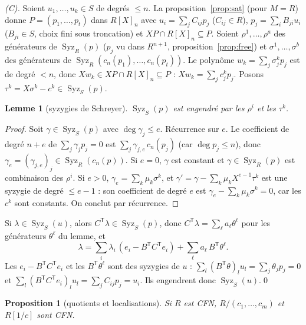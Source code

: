 \documentclass[11pt]{amsart}
\newtheorem{proposition}[theorem]{Proposition}
\newtheorem{lemma}[theorem]{Lemme}
\theoremstyle{definition}
\theoremstyle{remark}
\DeclareMathOperator{\Syz}{Syz}
\begin{document}
\emph{(C).} Soient $u_1,\dots,u_k\in S$ de degrés $\le n$. La
proposition~\ref{prop:sat} (pour $M=R$) donne $P=(p_1,\dots,p_t)$ dans
$R[X]_n$ avec $u_i=\sum_jC_{ij}p_j$ ($C_{ij}\in R$), $p_j=\sum_iB_{ji}u_i$
($B_{ji}\in S$, choix fini sous troncation) et $XP\cap R[X]_n\subseteq P$.
Soient $\rho^1,\dots,\rho^a$ des générateurs de $\Syz_R(p)$ ($p_j$ vu
dans $R^{n+1}$, proposition~\ref{prop:free}) et $\sigma^1,\dots,\sigma^b$
des générateurs de $\Syz_R(c_n(p_1),\dots,c_n(p_t))$. Le polynôme
$w_k=\sum_j\sigma^k_jp_j$ est de degré $<n$, donc
$Xw_k\in XP\cap R[X]_n\subseteq P$ : $Xw_k=\sum_jc^k_jp_j$. Posons
$\tau^k=X\sigma^k-c^k\in\Syz_S(p)$.

\begin{lemma}[syzygies de Schreyer]\label{lem:crit}
$\Syz_S(p)$ est engendré par les $\rho^i$ et les $\tau^k$.
\end{lemma}

\begin{proof}
Soit $\gamma\in\Syz_S(p)$ avec $\deg\gamma_j\le e$. Récurrence sur $e$.
Le coefficient de degré $n+e$ de $\sum_j\gamma_jp_j=0$ est
$\sum_j\gamma_{j,e}\,c_n(p_j)$ (car $\deg p_j\le n$), donc
$\gamma_e=(\gamma_{j,e})_j\in\Syz_R(c_n(p))$. Si $e=0$, $\gamma$ est
constant et $\gamma\in\Syz_R(p)$ est combinaison des $\rho^i$. Si $e>0$,
$\gamma_e=\sum_k\mu_k\sigma^k$, et
$\gamma'=\gamma-\sum_k\mu_kX^{e-1}\tau^k$ est une syzygie de degré
$\le e-1$ : son coefficient de degré $e$ est
$\gamma_e-\sum_k\mu_k\sigma^k=0$, car les $c^k$ sont constants. On
conclut par récurrence.
\end{proof}

Si $\lambda\in\Syz_S(u)$, alors $C^{\mathsf T}\lambda\in\Syz_S(p)$, donc
$C^{\mathsf T}\lambda=\sum_\ell a_\ell\theta^\ell$ pour les générateurs
$\theta^\ell$ du lemme, et
\[\lambda=\textstyle\sum_i\lambda_i\,(e_i-B^{\mathsf T}C^{\mathsf T}e_i)
+\sum_\ell a_\ell\,B^{\mathsf T}\theta^\ell .\]
Les $e_i-B^{\mathsf T}C^{\mathsf T}e_i$ et les $B^{\mathsf T}\theta^\ell$
sont des syzygies de $u$ :
$\sum_l(B^{\mathsf T}\theta)_lu_l=\sum_j\theta_jp_j=0$ et
$\sum_l(B^{\mathsf T}C^{\mathsf T}e_i)_lu_l=\sum_jC_{ij}p_j=u_i$. Ils
engendrent donc $\Syz_S(u)$.\qed


\begin{proposition}[quotients et localisations]\label{prop:closure}
Si $R$ est CFN, $R/(c_1,\dots,c_m)$ et $R[1/c]$ sont CFN.
\end{proposition}
\end{document}
